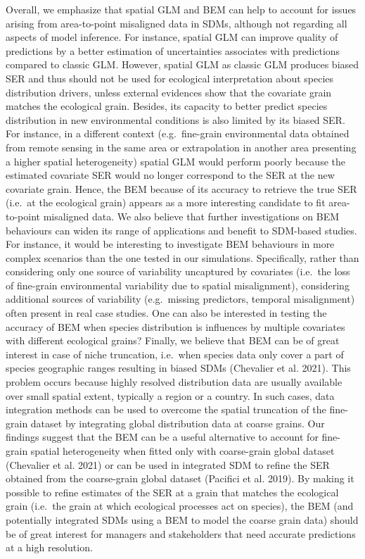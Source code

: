 \documentclass[
  12pt,
  a4paper]{article}
\begin{document}
Overall, we emphasize that spatial GLM and BEM can help to account for issues arising from area-to-point misaligned data in SDMs, although not regarding all aspects of model inference. For instance, spatial GLM can improve quality of predictions by a better estimation of uncertainties associates with predictions compared to classic GLM. However, spatial GLM as classic GLM produces biased SER and thus should not be used for ecological interpretation about species distribution drivers, unless external evidences show that the covariate grain matches the ecological grain. Besides, its capacity to better predict species distribution in new environmental conditions is also limited by its biased SER. For instance, in a different context (e.g.~fine-grain environmental data obtained from remote sensing in the same area or extrapolation in another area presenting a higher spatial heterogeneity) spatial GLM would perform poorly because the estimated covariate SER would no longer correspond to the SER at the new covariate grain. Hence, the BEM because of its accuracy to retrieve the true SER (i.e.~at the ecological grain) appears as a more interesting candidate to fit area-to-point misaligned data. We also believe that further investigations on BEM behaviours can widen its range of applications and benefit to SDM-based studies. For instance, it would be interesting to investigate BEM behaviours in more complex scenarios than the one tested in our simulations. Specifically, rather than considering only one source of variability uncaptured by covariates (i.e.~the loss of fine-grain environmental variability due to spatial misalignment), considering additional sources of variability (e.g.~missing predictors, temporal misalignment) often present in real case studies. One can also be interested in testing the accuracy of BEM when species distribution is influences by multiple covariates with different ecological grains? Finally, we believe that BEM can be of great interest in case of niche truncation, i.e.~when species data only cover a part of species geographic ranges resulting in biased SDMs (Chevalier et al. 2021). This problem occurs because highly resolved distribution data are usually available over small spatial extent, typically a region or a country. In such cases, data integration methods can be used to overcome the spatial truncation of the fine-grain dataset by integrating global distribution data at coarse grains. Our findings suggest that the BEM can be a useful alternative to account for fine-grain spatial heterogeneity when fitted only with coarse-grain global dataset (Chevalier et al. 2021) or can be used in integrated SDM to refine the SER obtained from the coarse-grain global dataset (Pacifici et al. 2019). By making it possible to refine estimates of the SER at a grain that matches the ecological grain (i.e.~the grain at which ecological processes act on species), the BEM (and potentially integrated SDMs using a BEM to model the coarse grain data) should be of great interest for managers and stakeholders that need accurate predictions at a high resolution.
\end{document}
